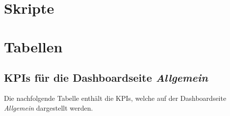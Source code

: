 \appendix


\chapter{Skripte}
\label{ch:skripte}
%	
%	
%	


%	
%	

\chapter{Tabellen}
\label{ch:tabellen}

\section{KPIs für die Dashboardseite \textit{Allgemein}}
Die nachfolgende Tabelle enthält die KPIs, welche auf der Dashboardseite \textit{Allgemein} dargestellt werden.

